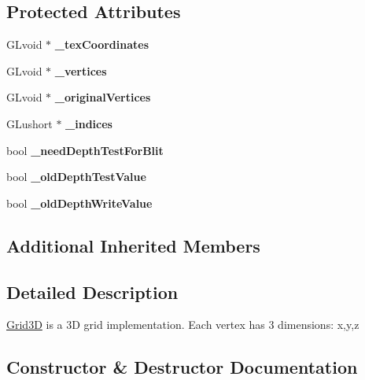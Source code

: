 \subsection*{Protected Attributes}
\begin{DoxyCompactItemize}
\item 
\mbox{\label{classGrid3D_a72af2c8b1c613d3ebd0a54c838b4d75c}} 
G\+Lvoid $\ast$ {\bfseries \+\_\+tex\+Coordinates}
\item 
\mbox{\label{classGrid3D_ad4be950f91cac6f42f4fb89b4a68e51c}} 
G\+Lvoid $\ast$ {\bfseries \+\_\+vertices}
\item 
\mbox{\label{classGrid3D_ae804d9c6f3bdd44f453904092f805cfe}} 
G\+Lvoid $\ast$ {\bfseries \+\_\+original\+Vertices}
\item 
\mbox{\label{classGrid3D_a325ec5e49bb62eac36873109031e8ebf}} 
G\+Lushort $\ast$ {\bfseries \+\_\+indices}
\item 
\mbox{\label{classGrid3D_a9dcafa17a6ccb5c75f4fe20f8ce66760}} 
bool {\bfseries \+\_\+need\+Depth\+Test\+For\+Blit}
\item 
\mbox{\label{classGrid3D_a52766f9da739bfcb7ad39ec0cacdf368}} 
bool {\bfseries \+\_\+old\+Depth\+Test\+Value}
\item 
\mbox{\label{classGrid3D_a50cd1e7dff7ddfba09ef214faf6196e9}} 
bool {\bfseries \+\_\+old\+Depth\+Write\+Value}
\end{DoxyCompactItemize}
\subsection*{Additional Inherited Members}


\subsection{Detailed Description}
\hyperlink{classGrid3D}{Grid3D} is a 3D grid implementation. Each vertex has 3 dimensions\+: x,y,z 

\subsection{Constructor \& Destructor Documentation}
\mbox{\label{classGrid3D_acfa00d6c0229c8c03a7c6e9ff05849c7}} 
